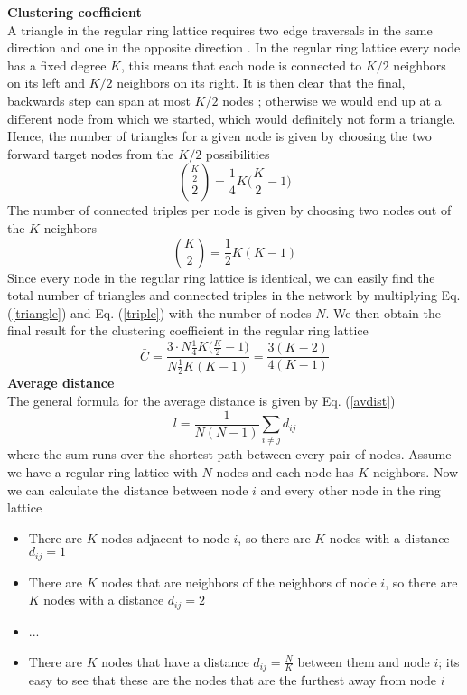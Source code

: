 \documentclass[11 pt , letterpaper , twoside , openright]{book}
\begin{document}
\textbf{Clustering coefficient}\\
\newline
A triangle in the regular ring lattice requires two edge traversals in the same direction and one in the opposite direction \cite{Pele2015}. In the regular ring lattice every node has a fixed degree $K$, this means that each node is connected to $K/2$ neighbors on its left and $K/2$ neighbors on its right. It is then clear that the final, backwards step can span at most $K/2$ nodes \cite{Pele2015}; otherwise we would end up at a different node from which we started, which would definitely not form a triangle.\\
Hence, the number of triangles for a given node is given by choosing the two forward target nodes from the $K/2$ possibilities \cite{Pele2015}
\begin{equation}\label{triangle}
	\binom{\frac{K}{2}}{2} = \frac{1}{4} K \bigg(\frac{K}{2} - 1 \bigg)
\end{equation}
The number of connected triples per node is given by choosing two nodes out of the $K$ neighbors \cite{Pele2015}
\begin{equation}\label{triple}
	\binom{K}{2} = \frac{1}{2} K (K-1)
\end{equation}
Since every node in the regular ring lattice is identical, we can easily find the total number of triangles and connected triples in the network by multiplying Eq. (\ref{triangle}) and Eq. (\ref{triple}) with the number of nodes $N$. We then obtain the final result for the clustering coefficient in the regular ring lattice \cite{Pele2015}
\begin{equation}
	\bar{C} = \frac{3\cdot N \frac{1}{4} K \bigg(\frac{K}{2} - 1 \bigg)}{N \frac{1}{2} K (K-1)} = \frac{3(K-2)}{4(K-1)}
\end{equation}
\newline
\textbf{Average distance}\\
\newline
The general formula for the average distance is given by Eq. (\ref{avdist})
\begin{equation}
	l = \frac{1}{N(N-1)} \sum_{i \neq j} d_{ij}
\end{equation}
where the sum runs over the shortest path between every pair of nodes. Assume we have a regular ring lattice with $N$ nodes and each node has $K$ neighbors. Now we can calculate the distance between node $i$ and every other node in the ring lattice
\begin{itemize}
	\item There are $K$ nodes adjacent to node $i$, so there are $K$ nodes with a distance $d_{ij} = 1$
	\item There are $K$ nodes that are neighbors of the neighbors of node $i$, so there are $K$ nodes with a distance $d_{ij} = 2$
	\item ...
	\item There are $K$ nodes that have a distance $d_{ij} = \frac{N}{K}$ between them and node $i$; its easy to see that these are the nodes that are the furthest away from node $i$ 
\end{itemize}  
\end{document}
